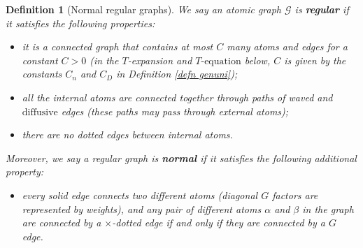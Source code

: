 \documentclass{article}
\newcommand{\1}{\mathds{1}}
\numberwithin{equation}{section}
\newcommand{\al}{\alpha}
\renewcommand{\cal}{\mathcal}
\newcommand{\dashed}{\text{diffusive}}
\theoremstyle{plain} %
\newtheorem{definition}[theorem]{Definition}
\theoremstyle{remark}
\newcommand{\cor}{\color{red}}
\newcommand{\cob}{\color{purple}}
\newcommand{\nc}{\normalcolor}
\newcommand{\incomp}{{\text{$T$-equation}}}
\newcommand{\hty}[1]{{\cor (ht: #1) }}
\begin{document}
 \begin{definition}[Normal regular graphs]  \label{defnlvl0} %
 We say an atomic graph $\cal G$ is {\bf regular} if it satisfies the following properties:
\begin{itemize}
\item[(i)] it is a connected graph that contains at most $C$ many atoms and edges for a constant $C>0$ (in the $T$-expansion and $\incomp$ below, $C$ is given by the constants $C_n$ and $C_D$ in Definition \ref{defn genuni});
\item[(ii)] all the internal atoms are connected together through paths of waved and $\dashed$ edges (these paths may pass through external atoms);
\item[(iii)] there are no dotted edges between internal atoms.
\end{itemize}
 Moreover, we say a regular graph is {\bf normal} if it satisfies the following additional property:
\begin{itemize}
\item[(iv)] every solid edge connects two different atoms (diagonal $G$ factors are represented by weights), and any pair of different atoms $\al$ and $\beta$ in the graph are connected by a $\times$-dotted edge \emph{if and only if} they are connected by a $G$ edge.
\end{itemize}

 \end{definition}
\end{document}
